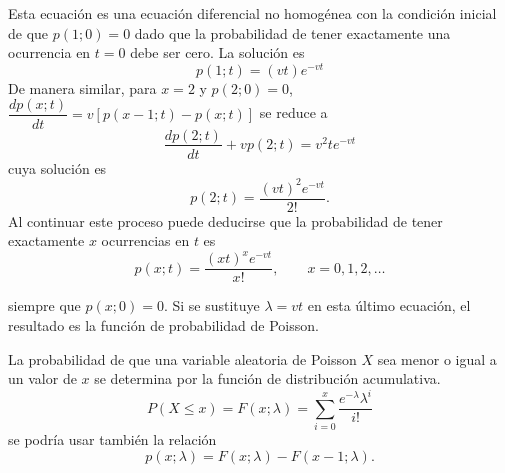 Esta ecuación es una ecuación diferencial no homogénea con la condición inicial de que $p(1;0)=0$ dado que la probabilidad de tener exactamente una ocurrencia en $t=0$ debe ser cero.  La solución es
$$p(1;t)=(vt) e^{-vt}$$
De manera similar, para $x=2$ y $p(2;0)=0$, $\dfrac{dp(x;t)}{dt}=v[p(x-1;t)-p(x;t)]$ se reduce a
$$\dfrac{dp(2;t)}{dt} + vp(2;t) = v^2te^{-vt}$$
cuya solución es 
$$p(2;t)=\dfrac{(vt)^2e^{-vt}}{2!}.$$
Al continuar este proceso puede deducirse que la probabilidad de tener exactamente $x$ ocurrencias en $t$ es 
$$p(x;t)=\dfrac{(xt)^x e^{-vt}}{x!},\qquad x=0,1,2,\ldots$$

siempre que $p(x;0)=0$. Si se sustituye $\lambda =vt$ en esta último ecuación, el resultado es la función de probabilidad de Poisson.\\

\begin{tcolorbox}
    La probabilidad de que una variable aleatoria de Poisson $X$ sea menor o igual a un valor de $x$ se determina por la función de distribución acumulativa.
    $$P(X\leq x)=F(x;\lambda)=\sum_{i=0}^x \dfrac{e^{-\lambda} \lambda^i}{i!}$$
    se podría usar también la relación
    $$p(x;\lambda) = F(x;\lambda)-F(x-1;\lambda).$$
\end{tcolorbox}

